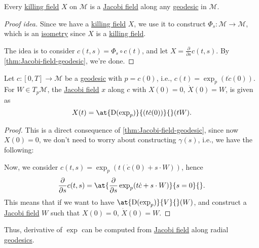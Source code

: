 \begin{corollary}
	Every \hyperref[def:killing-field]{killing field} \(X\) on \(\mathcal{M} \) is a \hyperref[def:Jacobi-field]{Jacobi field} along any \hyperref[def:geodesic]{geodesic} in \(\mathcal{M} \).
\end{corollary}
\begin{proof}[Proof idea]
	Since we have a \hyperref[def:killing-field]{killing field} \(X\), we use it to construct \(\Phi _s \colon \mathcal{M} \to \mathcal{M} \), which is an \hyperref[def:isometry]{isometry} since \(X\) is a \hyperref[def:killing-field]{killing field}.
	\begin{center}
	\end{center}
	The idea is to consider \(c(t, s) = \Phi _s \circ c(t)\), and let \(X = \frac{\partial }{\partial s} c(t, s)\). By \autoref{thm:Jacobi-field-geodesic}, we're done.
\end{proof}

\begin{corollary}
	Let \(c\colon [0, T] \to \mathcal{M} \) be a \hyperref[def:geodesic]{geodesic} with \(p = c(0)\), i.e., \(c(t) = \exp _p (t \dot{c} (0))\). For \(W\in T_p \mathcal{M} \), the \hyperref[def:Jacobi-field]{Jacobi field} \(x\) along \(c\) with \(X(0) = 0\), \(\dot{X} ( 0) = W\), is given as
	\[
		X(t) = \at{\mathrm{D} (\exp _p)}{(t \dot{c} (0))}{} (tW).
	\]
\end{corollary}
\begin{proof}
	This is a direct consequence of \autoref{thm:Jacobi-field-geodesic}, since now \(X(0) = 0\), we don't need to worry about constructing \(\gamma (s)\), i.e., we have the following:
	\begin{center}
	\end{center}
	Now, we consider \(c(t, s) = \exp _p (t(\dot{c} (0) + s\cdot W))\), hence
	\[
		\frac{\partial }{\partial s} c(t, s) = \at{\frac{\partial }{\partial s} \exp _p(t \dot{c} + s\cdot W)}{s = 0}{} .
	\]
	This means that if we want to have \(\at{\mathrm{D} (\exp _p)}{V}{} (W)\), and construct a \hyperref[def:Jacobi-field]{Jacobi field} \(W\) such that \(X(0)=0\), \(\dot{X} (0) = W\).
\end{proof}

\begin{remark}
	Thus, derivative of \(\exp \) can be computed from \hyperref[def:Jacobi-field]{Jacobi field} along radial \hyperref[def:geodesic]{geodesics}.
\end{remark}


